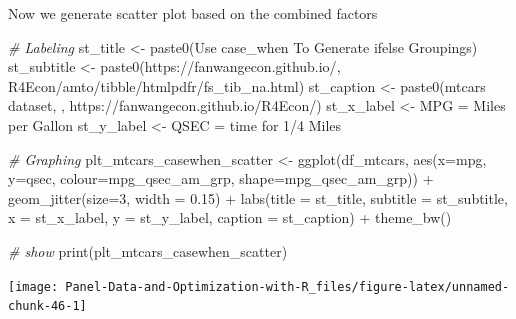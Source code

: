\documentclass[
]{book}
\newenvironment{Shaded}{\begin{snugshade}}{\end{snugshade}}
\newcommand{\AttributeTok}[1]{\textcolor[rgb]{0.77,0.63,0.00}{#1}}
\newcommand{\CommentTok}[1]{\textcolor[rgb]{0.56,0.35,0.01}{\textit{#1}}}
\newcommand{\DecValTok}[1]{\textcolor[rgb]{0.00,0.00,0.81}{#1}}
\newcommand{\FloatTok}[1]{\textcolor[rgb]{0.00,0.00,0.81}{#1}}
\newcommand{\FunctionTok}[1]{\textcolor[rgb]{0.00,0.00,0.00}{#1}}
\newcommand{\NormalTok}[1]{#1}
\newcommand{\OtherTok}[1]{\textcolor[rgb]{0.56,0.35,0.01}{#1}}
\newcommand{\SpecialCharTok}[1]{\textcolor[rgb]{0.00,0.00,0.00}{#1}}
\newcommand{\StringTok}[1]{\textcolor[rgb]{0.31,0.60,0.02}{#1}}
\begin{document}
Now we generate scatter plot based on the combined factors

\begin{Shaded}
\begin{Highlighting}[]
\CommentTok{\# Labeling}
\NormalTok{st\_title }\OtherTok{\textless{}{-}} \FunctionTok{paste0}\NormalTok{(}\StringTok{\textquotesingle{}Use case\_when To Generate ifelse Groupings\textquotesingle{}}\NormalTok{)}
\NormalTok{st\_subtitle }\OtherTok{\textless{}{-}} \FunctionTok{paste0}\NormalTok{(}\StringTok{\textquotesingle{}https://fanwangecon.github.io/\textquotesingle{}}\NormalTok{,}
                      \StringTok{\textquotesingle{}R4Econ/amto/tibble/htmlpdfr/fs\_tib\_na.html\textquotesingle{}}\NormalTok{)}
\NormalTok{st\_caption }\OtherTok{\textless{}{-}} \FunctionTok{paste0}\NormalTok{(}\StringTok{\textquotesingle{}mtcars dataset, \textquotesingle{}}\NormalTok{,}
                     \StringTok{\textquotesingle{}https://fanwangecon.github.io/R4Econ/\textquotesingle{}}\NormalTok{)}
\NormalTok{st\_x\_label }\OtherTok{\textless{}{-}} \StringTok{\textquotesingle{}MPG = Miles per Gallon\textquotesingle{}}
\NormalTok{st\_y\_label }\OtherTok{\textless{}{-}} \StringTok{\textquotesingle{}QSEC = time for 1/4 Miles\textquotesingle{}}

\CommentTok{\# Graphing}
\NormalTok{plt\_mtcars\_casewhen\_scatter }\OtherTok{\textless{}{-}} 
  \FunctionTok{ggplot}\NormalTok{(df\_mtcars, }
         \FunctionTok{aes}\NormalTok{(}\AttributeTok{x=}\NormalTok{mpg, }\AttributeTok{y=}\NormalTok{qsec, }
             \AttributeTok{colour=}\NormalTok{mpg\_qsec\_am\_grp, }
             \AttributeTok{shape=}\NormalTok{mpg\_qsec\_am\_grp)) }\SpecialCharTok{+}
  \FunctionTok{geom\_jitter}\NormalTok{(}\AttributeTok{size=}\DecValTok{3}\NormalTok{, }\AttributeTok{width =} \FloatTok{0.15}\NormalTok{) }\SpecialCharTok{+}
  \FunctionTok{labs}\NormalTok{(}\AttributeTok{title =}\NormalTok{ st\_title, }\AttributeTok{subtitle =}\NormalTok{ st\_subtitle,}
       \AttributeTok{x =}\NormalTok{ st\_x\_label, }\AttributeTok{y =}\NormalTok{ st\_y\_label, }\AttributeTok{caption =}\NormalTok{ st\_caption) }\SpecialCharTok{+}
  \FunctionTok{theme\_bw}\NormalTok{()}

\CommentTok{\# show}
\FunctionTok{print}\NormalTok{(plt\_mtcars\_casewhen\_scatter)}
\end{Highlighting}
\end{Shaded}

\begin{center}\texttt{[image: Panel-Data-and-Optimization-with-R\_files/figure-latex/unnamed-chunk-46-1]} \end{center}
\end{document}
